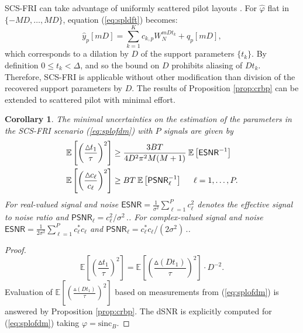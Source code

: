 \documentclass[journal,10pt]{IEEEtran}
\providecommand{\Esp}[1]{\mathbb{E}\left[#1\right]}
\newtheorem{corollary}{Corollary}
\begin{document}
SCS-FRI can take advantage of uniformly scattered pilot layouts \cite{Maravic2004,Barbotin2010}. For $\widehat\varphi$ flat in $\lbrace-MD,\dots, MD\rbrace$, equation (\ref{eq:spldft}) becomes:
\begin{equation}\widehat{y}_p[mD]=\sum_{k=1}^K c_{k,p}W_N^{mDt_k}+\widehat{q}_p[mD],\label{eq:splofdm}\end{equation}
which corresponds to a dilation by $D$ of the support parameters $\lbrace t_k\rbrace$. By definition $0\leq t_k < \Delta$, and so the bound on $D$ prohibits aliasing of $Dt_k$. Therefore, SCS-FRI is applicable without other modification than division of the recovered support parameters by $D$.
The results of Proposition \ref{prop:crbp} can be extended to scattered pilot with minimal effort.
\begin{corollary}
\label{thm:ofdmCRB}
The minimal uncertainties on the estimation of the parameters in the SCS-FRI scenario (\ref{eq:splofdm}) with $P$ signals are given by
\begin{align*}
  \Esp{\left(\frac{\vartriangle\!\! t_1}{\tau}\right)^2} &\geq \frac{3BT}{4D^2 \pi^2 M(M+1)}\:\Esp{\mathsf{ESNR}^{-1}} \\
  \Esp{\left(\frac{\vartriangle\!\! c_{\ell}}{c_{\ell}}\right)^2}&\geq BT\:\Esp{\mathsf{PSNR}_{\ell}^{-1}}  \hspace{0.5 cm}     \ell = 1, \ldots, P.
\end{align*}
For real-valued signal and noise  $\mathsf{ESNR} = \frac{1}{\sigma^2}\sum_{\ell = 1}^{P} c_{\ell}^2$ denotes the effective signal to noise ratio and $\mathsf{PSNR}_{\ell} = c_{\ell}^2/\sigma^2\,.$. For complex-valued signal and noise  $\mathsf{ESNR} = \frac{1}{2\sigma^2}\sum_{\ell = 1}^{P} c_{\ell}^\ast c_{\ell}$ and $\mathsf{PSNR}_{\ell} = c_{\ell}^\ast c_{\ell}/(2\sigma^2)\,.$.
\end{corollary}
\begin{proof}
$$\Esp{\left(\frac{\vartriangle\!\! t_1}{\tau}\right)^2}=\Esp{\left(\frac{\vartriangle\!\! (Dt_1)}{\tau}\right)^2}\cdot D^{-2}.$$
Evaluation of $\Esp{\left(\frac{\vartriangle\!\! (Dt_1)}{\tau}\right)^2}$ based on measurements from (\ref{eq:splofdm}) is answered by Proposition \ref{prop:crbp}. The \textsf{dSNR} is explicitly computed for (\ref{eq:splofdm}) taking $\varphi=\text{sinc}_B$. \end{proof}
\end{document}
